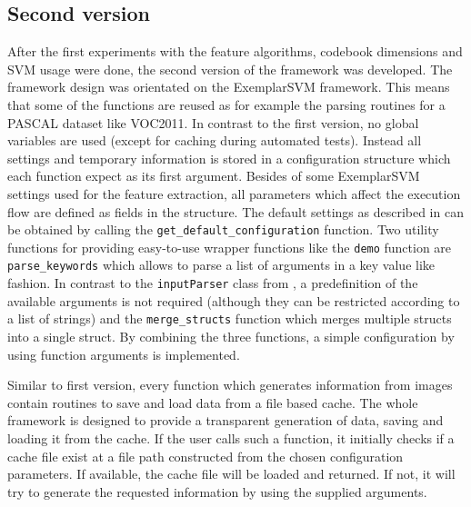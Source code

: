 \subsection{Second version}

After the first experiments with the feature algorithms, codebook dimensions and \ac{SVM} usage were done, the second version of the framework was developed. The framework design was orientated on the ExemplarSVM framework. This means that some of the functions are reused as for example the parsing routines for a PASCAL dataset like \ac{VOC2011}. In contrast to the first version, no global variables are used (except for caching during automated tests). Instead all settings and temporary information is stored in a configuration structure which each function expect as its first argument. Besides of some ExemplarSVM settings used for the feature extraction, all parameters which affect the execution flow are defined as fields in the structure. The default settings as described in  can be obtained by calling the \verb|get_default_configuration| function. Two utility functions for providing easy-to-use wrapper functions like the \verb|demo| function are \verb|parse_keywords| which allows to parse a list of arguments in a key value like fashion. In contrast to the \verb|inputParser| class from \MATLAB, a predefinition of the available arguments is not required (although they can be restricted according to a list of strings) and the \verb|merge_structs| function which merges multiple structs into a single struct. By combining the three functions, a simple configuration by using function arguments is implemented.

Similar to first version, every function which generates information from images contain routines to save and load data from a file based cache. The whole framework is designed to provide a transparent generation of data, saving and loading it from the cache. If the user calls such a function, it initially checks if a cache file exist at a file path constructed from the chosen configuration parameters. If available, the cache file will be loaded and returned. If not, it will try to generate the requested information by using the supplied arguments.

